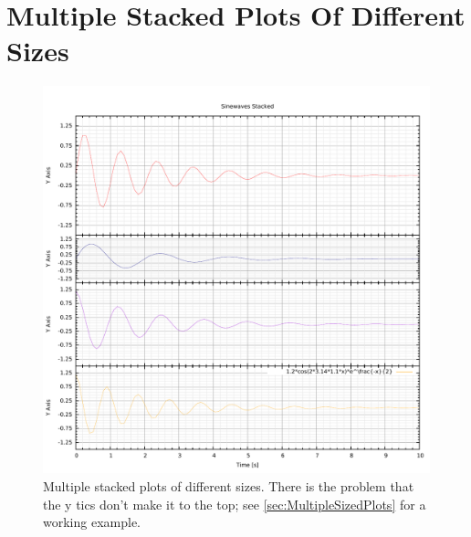 \documentclass[10pt,a4paper,final]{report}
\begin{document}
\section{Multiple Stacked Plots Of Different Sizes}
\begin{figure}[!hbtp]
\centering
\includegraphics[width=\textwidth]{../CodeJeanLuc/MultipleStackedPlots/MultipleStackedPlots.pdf}
\caption{Multiple stacked plots of different sizes.  There is the problem that the y tics don't make it to the top; see \autoref{sec:MultipleSizedPlots} for a working example.}
\end{figure}

\end{document}
